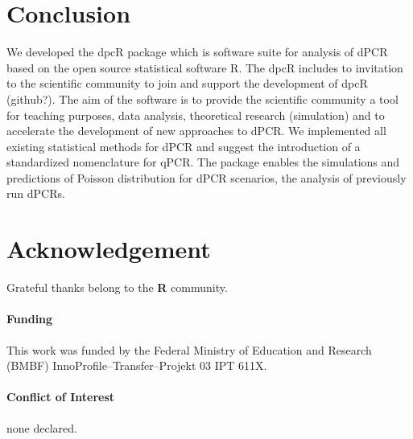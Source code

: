\documentclass{bioinfo}
\begin{document}
\section{Conclusion}

We developed the dpcR package which is software suite for analysis of dPCR based 
on the open source statistical software R. The dpcR includes to invitation to 
the scientific community to join and support the development of dpcR (github?). 
The aim of the software is to provide the scientific community a tool for 
teaching purposes, data analysis, theoretical research (simulation) and to 
accelerate the development of new approaches to dPCR. We implemented all 
existing statistical methods for dPCR and suggest the introduction of a 
standardized nomenclature for qPCR. The package enables the simulations and 
predictions of Poisson distribution for dPCR scenarios, the analysis of 
previously run dPCRs.

\section*{Acknowledgement}

Grateful thanks belong to the \textbf{R} community.

\paragraph{Funding\textcolon} This work was funded by the Federal Ministry of Education and Research (BMBF)
 InnoProfile--Transfer--Projekt 03 IPT 611X.

\paragraph{Conflict of Interest\textcolon} none declared.

%
%
%
%
%
%

%

\end{document}
